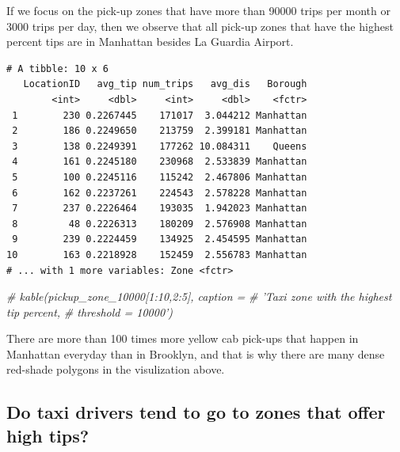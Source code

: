 \documentclass[12pt,twoside]{reedthesis}
\newenvironment{Shaded}{\begin{snugshade}}{\end{snugshade}}
\newcommand{\KeywordTok}[1]{\textcolor[rgb]{0.13,0.29,0.53}{\textbf{#1}}}
\newcommand{\DecValTok}[1]{\textcolor[rgb]{0.00,0.00,0.81}{#1}}
\newcommand{\StringTok}[1]{\textcolor[rgb]{0.31,0.60,0.02}{#1}}
\newcommand{\CommentTok}[1]{\textcolor[rgb]{0.56,0.35,0.01}{\textit{#1}}}
\newcommand{\OperatorTok}[1]{\textcolor[rgb]{0.81,0.36,0.00}{\textbf{#1}}}
\newcommand{\NormalTok}[1]{#1}
\theoremstyle{definition}
\theoremstyle{definition}
\theoremstyle{definition}
\theoremstyle{remark}
\begin{document}
If we focus on the pick-up zones that have more than 90000 trips per
month or 3000 trips per day, then we observe that all pick-up zones that
have the highest percent tips are in Manhattan besides La Guardia
Airport.
\begin{Shaded}
\end{Shaded}
\begin{verbatim}
# A tibble: 10 x 6
   LocationID   avg_tip num_trips   avg_dis   Borough
        <int>     <dbl>     <int>     <dbl>    <fctr>
 1        230 0.2267445    171017  3.044212 Manhattan
 2        186 0.2249650    213759  2.399181 Manhattan
 3        138 0.2249391    177262 10.084311    Queens
 4        161 0.2245180    230968  2.533839 Manhattan
 5        100 0.2245116    115242  2.467806 Manhattan
 6        162 0.2237261    224543  2.578228 Manhattan
 7        237 0.2226464    193035  1.942023 Manhattan
 8         48 0.2226313    180209  2.576908 Manhattan
 9        239 0.2224459    134925  2.454595 Manhattan
10        163 0.2218928    152459  2.556783 Manhattan
# ... with 1 more variables: Zone <fctr>
\end{verbatim}
\begin{Shaded}
\begin{Highlighting}[]
\CommentTok{# kable(pickup_zone_10000[1:10,2:5], caption =}
\CommentTok{# 'Taxi zone with the highest tip percent,}
\CommentTok{# threshold = 10000')}
\end{Highlighting}
\end{Shaded}
There are more than 100 times more yellow cab pick-ups that happen in
Manhattan everyday than in Brooklyn, and that is why there are many
dense red-shade polygons in the visulization above.

\subsection{Do taxi drivers tend to go to zones that offer high
tips?}\label{do-taxi-drivers-tend-to-go-to-zones-that-offer-high-tips}
\end{document}
